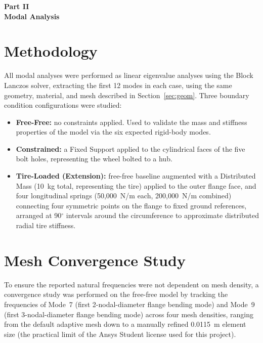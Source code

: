 \documentclass[11pt]{article}
\begin{document}
\begin{center}
{\LARGE\bfseries Part II}\\[0.3em]
{\Large\bfseries Modal Analysis}
\end{center}
\vspace{0.5em}

\section{Methodology}

All modal analyses were performed as linear eigenvalue analyses using the Block Lanczos
solver, extracting the first 12 modes in each case, using the same geometry, material,
and mesh described in Section~\ref{sec:geom}. Three boundary condition configurations
were studied:

\begin{itemize}
    \item \textbf{Free-Free:} no constraints applied. Used to validate the mass and
    stiffness properties of the model via the six expected rigid-body modes.
    \item \textbf{Constrained:} a Fixed Support applied to the cylindrical faces of the
    five bolt holes, representing the wheel bolted to a hub.
    \item \textbf{Tire-Loaded (Extension):} free-free baseline augmented with a
    Distributed Mass (10~kg total, representing the tire) applied to the outer flange
    face, and four longitudinal springs (50{,}000~N/m each, 200{,}000~N/m combined)
    connecting four symmetric points on the flange to fixed ground references, arranged
    at 90$^\circ$ intervals around the circumference to approximate distributed radial
    tire stiffness.
\end{itemize}

\section{Mesh Convergence Study}
\label{sec:convergence}
\label{sec:geom}

To ensure the reported natural frequencies were not dependent on mesh density, a
convergence study was performed on the free-free model by tracking the frequencies of
Mode~7 (first 2-nodal-diameter flange bending mode) and Mode~9 (first
3-nodal-diameter flange bending mode) across four mesh densities, ranging from the
default adaptive mesh down to a manually refined 0.0115~m element size (the practical
limit of the Ansys Student license used for this project).
\end{document}
